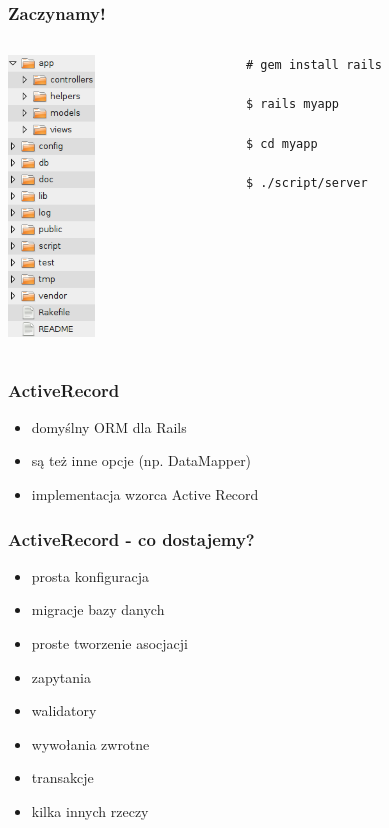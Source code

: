 \documentclass[12t]{beamer}
\begin{document}
\begin{frame}[fragile]
  \frametitle{Zaczynamy!}
  \begin{columns}[T]
    \begin{column}{2.3cm}
      \includegraphics[width=2.3cm]{structure.png}
    \end{column}
    \begin{column}{7.5cm}
\begin{verbatim}
# gem install rails

$ rails myapp

$ cd myapp

$ ./script/server
\end{verbatim}
    \end{column}
  \end{columns}
\end{frame}

\begin{frame}
  \frametitle{ActiveRecord}
  \begin{itemize}
  \item domyślny ORM dla Rails
  \item są też inne opcje (np. DataMapper)
  \item implementacja wzorca Active Record
  \end{itemize}
\end{frame}

\begin{frame}
  \frametitle{ActiveRecord - co dostajemy?}
  \begin{itemize}
  \item prosta konfiguracja
  \item migracje bazy danych
  \item proste tworzenie asocjacji
  \item zapytania
  \item walidatory
  \item wywołania zwrotne
  \item transakcje
  \item kilka innych rzeczy
  \end{itemize}
\end{frame}
\end{document}
